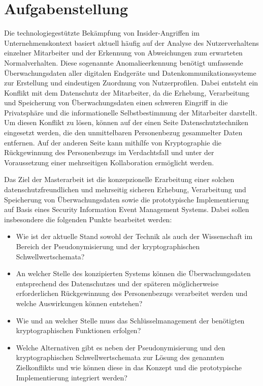 \chapter*{Aufgabenstellung}

Die technologiegestützte Bekämpfung von Insider-Angriffen im Unternehmenskontext basiert aktuell häufig auf der Analyse des Nutzerverhaltens einzelner Mitarbeiter und der Erkennung von Abweichungen zum erwarteten Normalverhalten. Diese sogenannte Anomalieerkennung benötigt umfassende Überwachungsdaten aller digitalen Endgeräte und Datenkommunikationssysteme zur Erstellung und eindeutigen Zuordnung von Nutzerprofilen. Dabei entsteht ein Konflikt mit dem Datenschutz der Mitarbeiter, da die Erhebung, Verarbeitung und Speicherung von Überwachungsdaten einen schweren Eingriff in die Privatsphäre und die informationelle Selbstbestimmung der Mitarbeiter darstellt. Um diesen Konflikt zu lösen, können auf der einen Seite Datenschutztechniken eingesetzt werden, die den unmittelbaren Personenbezug gesammelter Daten entfernen. Auf der anderen Seite kann mithílfe von Kryptographie die Rückgewinnung des Personenbezugs im Verdachtsfall und unter der Voraussetzung einer mehrseitigen Kollaboration ermöglicht werden.

Das Ziel der Masterarbeit ist die konzepzionelle Erarbeitung einer solchen datenschutzfreundlichen und mehrseitig sicheren Erhebung, Verarbeitung und Speicherung von Überwachungsdaten sowie die prototypische Implementierung auf Basis eines Security Information Event Management Systems. Dabei sollen insbesondere die folgenden Punkte bearbeitet werden:

\begin{itemize}
  \item Wie ist der aktuelle Stand sowohl der Technik als auch der Wissenschaft im Bereich der Pseudonymisierung und der kryptographischen Schwellwertschemata?
  \item An welcher Stelle des konzipierten Systems können die Überwachungsdaten entsprechend des Datenschutzes und der späteren möglicherweise erforderlichen Rückgewinnung des Personenbezugs verarbeitet werden und welche Auswirkungen können entstehen?
  \item Wie und an welcher Stelle muss das Schlüsselmanagement der benötigten kryptographischen Funktionen erfolgen?
  \item Welche Alternativen gibt es neben der Pseudonymisierung und den kryptographischen Schwellwertschemata zur Lösung des genannten Zielkonflikts und wie können diese in das Konzept und die prototypische Implementierung integriert werden?
\end{itemize}